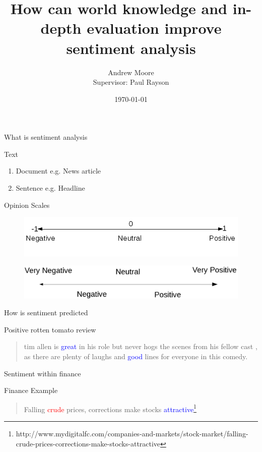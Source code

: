 \documentclass[10pt]{beamer}
\title{How can world knowledge and in-depth evaluation improve sentiment analysis}
\author{Andrew Moore\\{\small Supervisor: Paul Rayson}\\}
\date{\today}
\institute{School of Computing and Communications, Lancaster University.}
\begin{document}
\maketitle
\begin{frame}[fragile]{What is sentiment analysis}
\begin{block}{Text}
  \begin{enumerate}
    \item Document e.g. News article
    \item Sentence e.g. Headline
  \end{enumerate}
\end{block}

\begin{block}{Opinion Scales}
\begin{figure}
  \includegraphics[scale=0.3]{sentiment_range.png}
\end{figure}
\begin{figure}
  \includegraphics[scale=0.2]{long_sentiment_range.png}
\end{figure}
\end{block}
\end{frame}

\begin{frame}[fragile]{How is sentiment predicted}
  \begin{block}{Positive rotten tomato review}
    \begin{quote}
tim allen is \textcolor{blue}{great} in his role but never hogs the scenes from his fellow cast , as there are plenty of laughs and \textcolor{blue}{good} lines for everyone in this comedy. \citep{pang_2005}
    \end{quote}
  \end{block}
\end{frame}

\begin{frame}[fragile]{Sentiment within finance}
  \begin{block}{Finance Example}
    \begin{quote}
Falling \textcolor{red}{crude} prices, corrections make stocks \textcolor{blue}{attractive}\footnote{http://www.mydigitalfc.com/companies-and-markets/stock-market/falling-crude-prices-corrections-make-stocks-attractive}
    \end{quote}
  \end{block}
\end{frame}
\end{document}
